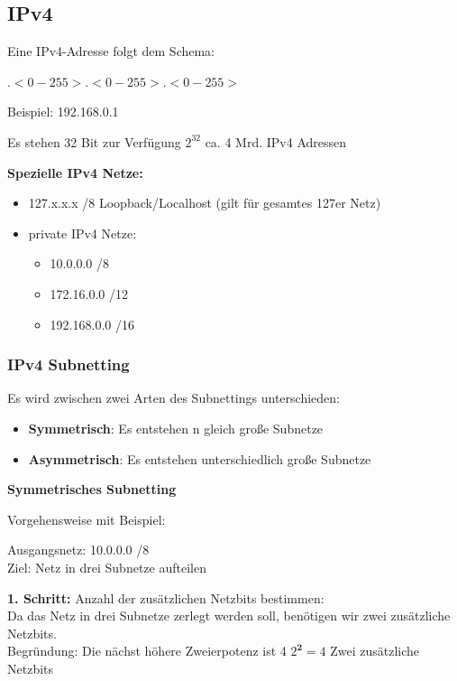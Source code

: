 \documentclass[10pt]{article}
\begin{document}
\subsection{IPv4}

Eine IPv4-Adresse folgt dem Schema:

\(<0-255>.<0-255>.<0-255>.<0-255>\)

Beispiel: 192.168.0.1

Es stehen 32 Bit zur Verfügung \textrightarrow\space \(2^{32}\) \textrightarrow\space ca. 4 Mrd. IPv4 Adressen

\textbf{Spezielle IPv4 Netze:}
\begin{itemize}
    \item 127.x.x.x /8 \textrightarrow\space Loopback/Localhost (gilt für gesamtes 127er Netz)
    \item private IPv4 Netze:
        \begin{itemize}
            \item 10.0.0.0 /8
            \item 172.16.0.0 /12
            \item 192.168.0.0 /16
        \end{itemize}
\end{itemize}

\subsubsection{IPv4 Subnetting}

Es wird zwischen zwei Arten des Subnettings unterschieden:
\begin{itemize}
    \item \textbf{Symmetrisch}: Es entstehen n gleich große Subnetze
    \item \textbf{Asymmetrisch}: Es entstehen unterschiedlich große Subnetze
\end{itemize}

\textbf{Symmetrisches Subnetting}

Vorgehensweise mit Beispiel:

Ausgangsnetz: 10.0.0.0 /8\\
Ziel: Netz in drei Subnetze aufteilen

\textbf{1. Schritt:} Anzahl der zusätzlichen Netzbits bestimmen:\\
Da das Netz in drei Subnetze zerlegt werden soll, benötigen wir zwei zusätzliche Netzbits.\\
Begründung: Die nächst höhere Zweierpotenz ist 4 \textrightarrow\space \(2^\textbf{2} = 4\) \textrightarrow\space Zwei zusätzliche Netzbits
\end{document}
